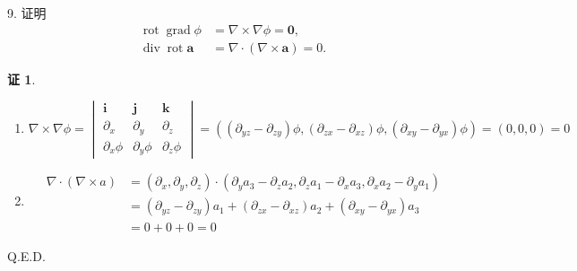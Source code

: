 \documentclass[a4paper,12pt]{article}
\theoremstyle{definition}
\newtheorem*{pf}{证}
\begin{document}
9. 证明
\begin{align*}
    \operatorname{rot}\operatorname{grad}\phi
     & =\nabla\times\nabla\phi=\boldsymbol{0},     \\
    \operatorname{div}\operatorname{rot}\boldsymbol{a}
     & =\nabla\cdot(\nabla\times\boldsymbol{a})=0.
\end{align*}
\begin{pf}
    \begin{enumerate}
        \item $\nabla\times\nabla\phi=\begin{vmatrix}
                      \boldsymbol{i} & \boldsymbol{j} & \boldsymbol{k} \\
                      \partial_x     & \partial_y     & \partial_z     \\
                      \partial_x\phi & \partial_y\phi & \partial_z\phi
                  \end{vmatrix}=((\partial_{yz}-\partial_{zy})\phi, (\partial_{zx}-\partial_{xz})\phi, (\partial_{xy}-\partial_{yx})\phi)=(0,0,0)=0$
        \item \begin{align*}
                  \nabla\cdot(\nabla\times a)
                   & =(\partial_x,\partial_y,\partial_z)\cdot(\partial_y a_3 - \partial_z a_2, \partial_z a_1 - \partial_x a_3, \partial_x a_2 - \partial_y a_1) \\
                   & =(\partial_{yz}-\partial_{zy})a_1+(\partial_{zx}-\partial_{xz})a_2+(\partial_{xy}-\partial_{yx})a_3                                         \\
                   & =0+0+0=0
              \end{align*}
    \end{enumerate}

    Q.E.D.
\end{pf}
\end{document}
